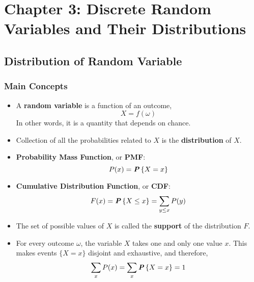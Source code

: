 \section{Chapter 3: Discrete Random Variables and Their Distributions}

\begin{multicols}{2}
\setlength{\columnsep}{1.5cm}
\setlength{\columnseprule}{0.2pt}

\subsection{Distribution of Random Variable}

\subsubsection{Main Concepts}

\begin{itemize}
  \item A \textbf{random variable} is a function of an outcome,
    \begin{equation*}
        X = f(\omega)
    \end{equation*}
    In other words, it is a quantity that depends on chance.
  
  \item Collection of all the probabilities related to $X$ is the \textbf{distribution} of $X$. 
  
  \item \textbf{Probability Mass Function}, or \textbf{PMF}:
    \begin{equation*}
      P(x) = \textbf{\textit{P}}\left\{X = x\right\}
    \end{equation*}
  
  \item \textbf{Cumulative Distribution Function}, or \textbf{CDF}:
    \begin{equation*}
        F(x) = \textbf{\textit{P}}\left\{X \leq x\right\} = \sum_{y \leq x} P(y)
    \end{equation*}
  
  \item The set of possible values of $X$ is called the \textbf{support} of the distribution $F$.
  
  \item For every outcome $\omega$, the variable $X$ takes one and only one value $x$. This makes events $\{X = x\}$ disjoint and exhaustive, and therefore,
  \begin{equation*}
      \sum_x P(x) = \sum_x \textbf{\textit{P}}\left\{X = x\right\} = 1
  \end{equation*}
\end{itemize}


\end{multicols}
